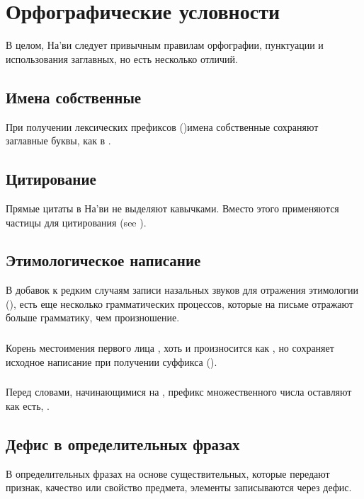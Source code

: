 \section{Орфографические условности}
\noindent В целом, На'ви следует привычным правилам орфографии, пунктуации и использования заглавных, но есть несколько отличий.

\subsection{Имена собственные} При получении лексических префиксов
()имена соб\-ствен\-ные сохраняют заглавные буквы, как в .

\subsection{Цитирование} Прямые цитаты в На'ви не выделяют кавычками.  Вместо этого применяются частицы для цитирования
 (see ).

\subsection{Этимологическое написание} В добавок к редким случаям записи назальных звуков для отражения этимологии (),
есть еще несколько грамматических процессов, которые на письме отражают больше грамматику, чем произношение.

\subsubsection{} Корень местоимения первого лица , хоть и
произносится как , но сохраняет исходное написание при получении суффикса 
().

\subsubsection{} Перед словами, начинающимися на , префикс множественного числа
 ос\-тав\-ля\-ют как есть, .

\subsection{Дефис в определительных фразах} В определительных фразах на основе су\-ще\-стви\-тель\-ных, которые передают признак, качество или свойство предмета, элементы записываются через дефис.

